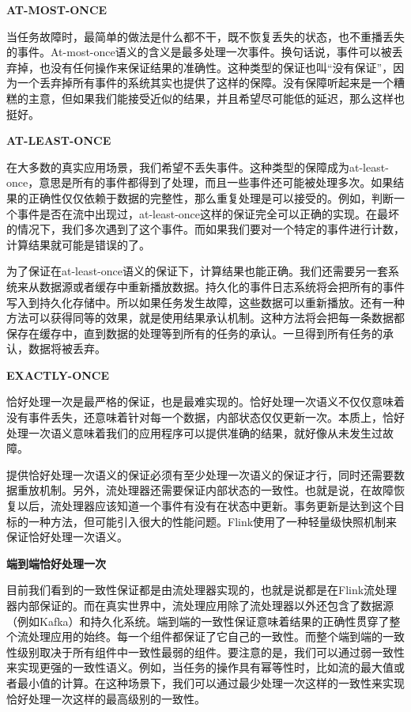 \documentclass[oneside]{ctexbook}
\begin{document}
\textbf{AT-MOST-ONCE}

当任务故障时，最简单的做法是什么都不干，既不恢复丢失的状态，也不重播丢失的事件。At-most-once语义的含义是最多处理一次事件。换句话说，事件可以被丢弃掉，也没有任何操作来保证结果的准确性。这种类型的保证也叫“没有保证”，因为一个丢弃掉所有事件的系统其实也提供了这样的保障。没有保障听起来是一个糟糕的主意，但如果我们能接受近似的结果，并且希望尽可能低的延迟，那么这样也挺好。

\textbf{AT-LEAST-ONCE}

在大多数的真实应用场景，我们希望不丢失事件。这种类型的保障成为at-least-once，意思是所有的事件都得到了处理，而且一些事件还可能被处理多次。如果结果的正确性仅仅依赖于数据的完整性，那么重复处理是可以接受的。例如，判断一个事件是否在流中出现过，at-least-once这样的保证完全可以正确的实现。在最坏的情况下，我们多次遇到了这个事件。而如果我们要对一个特定的事件进行计数，计算结果就可能是错误的了。

为了保证在at-least-once语义的保证下，计算结果也能正确。我们还需要另一套系统来从数据源或者缓存中重新播放数据。持久化的事件日志系统将会把所有的事件写入到持久化存储中。所以如果任务发生故障，这些数据可以重新播放。还有一种方法可以获得同等的效果，就是使用结果承认机制。这种方法将会把每一条数据都保存在缓存中，直到数据的处理等到所有的任务的承认。一旦得到所有任务的承认，数据将被丢弃。

\textbf{EXACTLY-ONCE}

恰好处理一次是最严格的保证，也是最难实现的。恰好处理一次语义不仅仅意味着没有事件丢失，还意味着针对每一个数据，内部状态仅仅更新一次。本质上，恰好处理一次语义意味着我们的应用程序可以提供准确的结果，就好像从未发生过故障。

提供恰好处理一次语义的保证必须有至少处理一次语义的保证才行，同时还需要数据重放机制。另外，流处理器还需要保证内部状态的一致性。也就是说，在故障恢复以后，流处理器应该知道一个事件有没有在状态中更新。事务更新是达到这个目标的一种方法，但可能引入很大的性能问题。Flink使用了一种轻量级快照机制来保证恰好处理一次语义。

\textbf{端到端恰好处理一次}

目前我们看到的一致性保证都是由流处理器实现的，也就是说都是在Flink流处理器内部保证的。而在真实世界中，流处理应用除了流处理器以外还包含了数据源（例如Kafka）和持久化系统。端到端的一致性保证意味着结果的正确性贯穿了整个流处理应用的始终。每一个组件都保证了它自己的一致性。而整个端到端的一致性级别取决于所有组件中一致性最弱的组件。要注意的是，我们可以通过弱一致性来实现更强的一致性语义。例如，当任务的操作具有幂等性时，比如流的最大值或者最小值的计算。在这种场景下，我们可以通过最少处理一次这样的一致性来实现恰好处理一次这样的最高级别的一致性。
\end{document}
